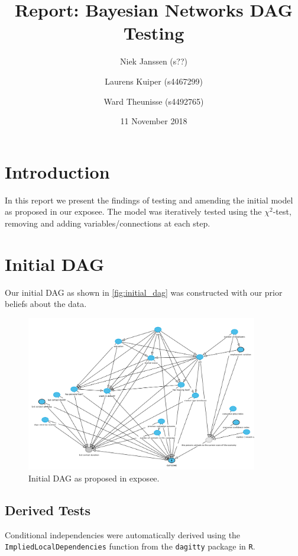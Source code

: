 \documentclass[11pt]{article}
\title{Report: Bayesian Networks DAG Testing}
\date{11 November 2018}
\author{Niek Janssen (s??)\and Laurens Kuiper (s4467299)\and Ward Theunisse (s4492765)}
\begin{document}
\maketitle
\thispagestyle{empty}
\newpage
\section{Introduction}
In this report we present the findings of testing and amending the initial model as proposed in our exposee.
The model was iteratively tested using the $\chi^2$-test, removing and adding variables/connections at each step.

\section{Initial DAG}
Our initial DAG as shown in \autoref{fig:initial_dag} was constructed with our prior beliefs about the data.

\begin{figure}[h]
	\centering
	\includegraphics[width=0.9\textwidth]{images/initial_dag}
	\caption{Initial DAG as proposed in exposee.}
	\label{fig:initial_dag}
\end{figure}

\subsection{Derived Tests}
Conditional independencies were automatically derived using the \texttt{ImpliedLocalDependencies} function from the \texttt{dagitty} package in \texttt{R}.
\end{document}
